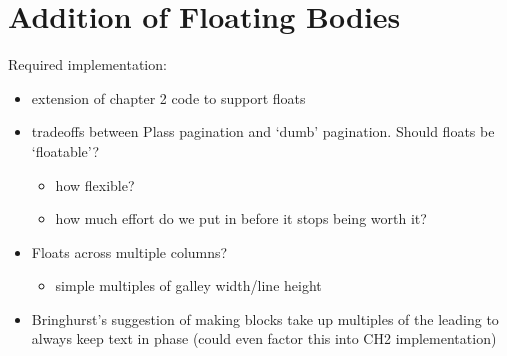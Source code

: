 \cleardoublepage
\chapter{Addition of Floating Bodies}\label{ch:floats}

Required implementation:
\begin{itemize}
    \item extension of chapter 2 code to support floats
    \item tradeoffs between Plass\cite{Plass1981} pagination and `dumb' pagination. Should floats be
    `floatable'?
    \begin{itemize}
        \item how flexible?
        \item how much effort do we put in before it stops being worth it?
    \end{itemize}
    \item Floats across multiple columns?
    \begin{itemize}
        \item simple multiples of galley width/line height
    \end{itemize}
    \item Bringhurst's suggestion\cite{Bringhurst2008} of making blocks take up multiples of the
    leading to always keep text in phase (could even factor this into CH2 implementation)

\end{itemize}
